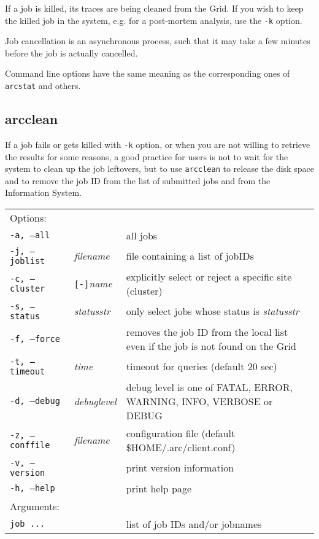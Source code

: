 If a job is killed, its traces are being cleaned from the Grid. If you wish to keep the killed job
in the system, e.g. for a post-mortem analysis, use the \verb#-k# option.

\begin{framed}
   Job cancellation is an asynchronous process, such that it
   may take a few minutes before the job is actually cancelled.
\end{framed}

Command line options have the same meaning as the corresponding ones of \verb#arcstat# and others.


\subsection{arcclean}
\label{sec:arcclean}

If a job fails or gets killed with \verb#-k# option, or when you are not willing
to retrieve the results for some reasons, a good practice for users is not to wait
for the system to clean up the job leftovers, but to use
\texttt{arcclean} to release the disk
space and to remove the job ID from the list of submitted jobs and from the Information System.

\hspace*{0.5cm}
\begin{shaded}
\end{shaded}
\begin{longtable}{llp{8cm}}
   Options:&&\\
   \texttt{-a, --all}& & all jobs\\
   \texttt{-j, --joblist}& \textit{filename} & file containing a list of jobIDs\\
   \texttt{-c, --cluster}&\verb#[-]#\textit{name}&explicitly select or reject a specific site (cluster)\\
   \texttt{-s, --status}& \textit{statusstr} &only select jobs whose status is \textit{statusstr}\\
   \texttt{-f, --force} & & removes the job ID from the local list even if the job is not found on the Grid\\
   \texttt{-t, --timeout}& \textit{time} & timeout for queries (default 20 sec)\\
   \texttt{-d, --debug}& \textit{debuglevel}&debug level is one of  FATAL, ERROR, WARNING, INFO, VERBOSE or DEBUG\\
   \texttt{-z, --conffile}&\textit{filename}& configuration file (default {\$}HOME/.arc/client.conf)\\
   \texttt{-v, --version}& & print version information\\
   \texttt{-h, --help}& & print help page\\
   Arguments:&&\\
   \texttt{job ...} && list of job IDs and/or jobnames\\
\end{longtable}

